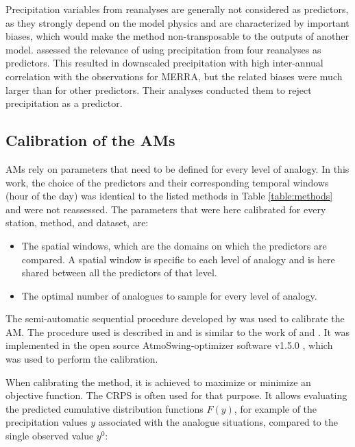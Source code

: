 \documentclass{ametsoc}
\begin{document}
Precipitation variables from reanalyses are generally not considered as predictors, as they strongly depend on the model physics \citep{Rienecker2011} and are characterized by important biases, which would make the method non-transposable to the outputs of another model. \citet{Dayon2015} assessed the relevance of using precipitation from four reanalyses as predictors. This resulted in downscaled precipitation with high inter-annual correlation with the observations for MERRA, but the related biases were much larger than for other predictors. Their analyses conducted them to reject precipitation as a predictor.


\subsection{Calibration of the AMs}
\label{sec:calibration}

AMs rely on parameters that need to be defined for every level of analogy. In this work, the choice of the predictors and their corresponding temporal windows (hour of the day) was identical to the listed methods in Table \ref{table:methods} and were not reassessed. The parameters that were here calibrated for every station, method, and dataset, are:

\begin{itemize}
	\item The spatial windows, which are the domains on which the predictors are compared. A spatial window is specific to each level of analogy and is here shared between all the predictors of that level.
	\item The optimal number of analogues to sample for every level of analogy.
\end{itemize}

The semi-automatic sequential procedure developed by \citet{Bontron2004} was used to calibrate the AM. The procedure used is described in \citet{Horton2017c} and is similar to the work of \citet{Radanovics2013} and \citet{BenDaoud2016}. It was implemented in the open source AtmoSwing-optimizer software v1.5.0 \citep[www.atmoswing.org,][]{Horton2017a}, which was used to perform the calibration.

When calibrating the method, it is achieved to maximize or minimize an objective function. The CRPS \citep[Continuous Ranked Probability Score,][]{Brown1974, Matheson1976, Hersbach2000} is often used for that purpose. It allows evaluating the predicted cumulative distribution functions $F(y)$, for example of the precipitation values $y$ associated with the analogue situations, compared to the single observed value $y^{0}$:
\end{document}
